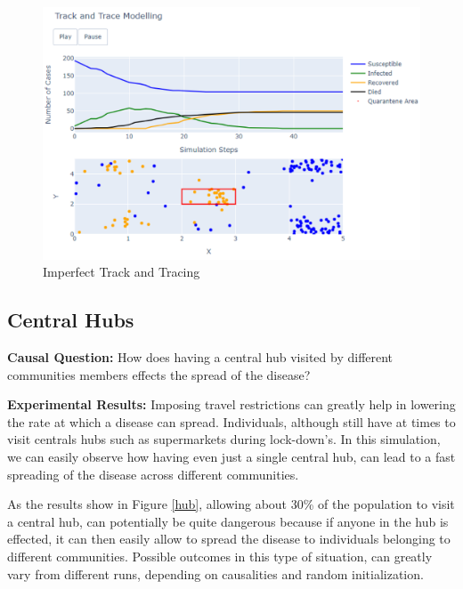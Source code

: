 \vspace{-0.4cm}
\begin{figure}[ht!]%
    \centering
    \includegraphics[width=0.85\linewidth]{latex/images/track2.pdf}
    \vspace{-0.4cm}
    \caption{Imperfect Track and Tracing}
    \label{track2}
\end{figure}
\vspace{-0.3cm}

\subsection{Central Hubs}

\textbf{Causal Question:} How does having a central hub visited by different communities members effects the spread of the disease?

\textbf{Experimental Results:} Imposing travel restrictions can greatly help in lowering the rate at which a disease can spread. Individuals, although still have at times to visit centrals hubs such as supermarkets during lock-down's. In this simulation, we can easily observe how having even just a single central hub, can lead to a fast spreading of the disease across different communities.

As the results show in Figure \ref{hub}, allowing about 30\% of the population to visit a central hub, can potentially be quite dangerous because if anyone in the hub is effected, it can then easily allow to spread the disease to individuals belonging to different communities. Possible outcomes in this type of situation, can greatly vary from different runs, depending on causalities and random initialization.

